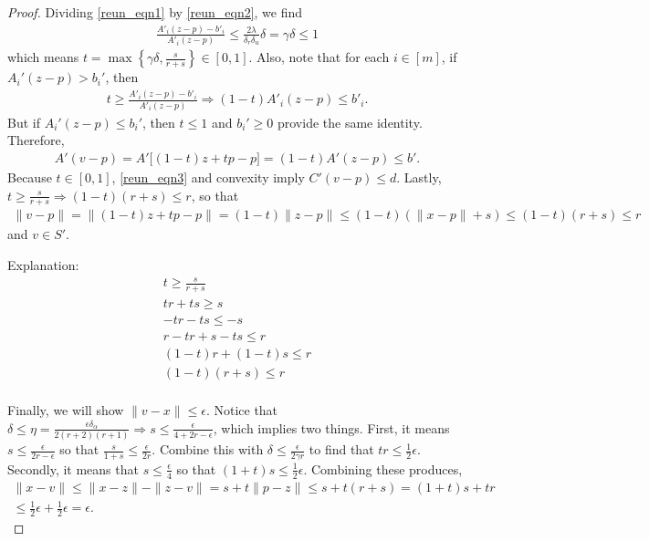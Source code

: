 \begin{proof}

Dividing \cref{reun_eqn1} by \cref{reun_eqn2}, we find
\begin{align*}
\frac{A'_i (z - p) - b'_i}{A'_i (z - p)} \le \frac{2\lambda}{\delta_r \delta_u}\delta = \gamma \delta \le 1
\end{align*}
which means $t = \max\left\{\gamma \delta, \frac{s}{r+s}\right\} \in [0, 1]$.
Also, note that for each $i \in [m]$, if $A_i'(z - p) > b_i'$, then
\begin{align*}
t \ge \frac{A'_i (z - p) - b'_i}{A'_i (z - p)}
\Longrightarrow (1-t) A'_i (z - p) \le b'_i.
\end{align*}
But if $A_i'(z - p) \le b_i'$, then $t \le 1$ and $b_i' \ge 0$ provide the same identity.
Therefore, 
\begin{align*}
A'(v - p) = A' \bigg[(1-t) z + tp - p\bigg] = (1-t) A' (z - p) \le b'.
\end{align*}
Because $t \in [0, 1]$, \cref{reun_eqn3} and convexity imply $C'(v - p) \le d$.
Lastly, $t \ge \frac{s}{r + s} \Longrightarrow (1 - t) \left(r + s\right) \le r$, so that
\begin{align*}
\|v - p\| = \|(1-t)z + t p - p\| = (1 - t) \|z - p\| \le (1 - t) \left(\|x - p\| + s\right) \le (1 - t) \left(r + s\right) \le r
\end{align*}
and $v \in S'$.
\begin{boxedcomment}
Explanation:
\begin{align*}
t \ge \frac{s}{r + s} \\
 tr + ts \ge s \\
- tr - ts \le -s \\
r - tr + s - ts \le r \\
(1 - t) r + (1 - t)s \le r \\
(1 - t) \left(r + s\right) \le r \\
\end{align*}
\end{boxedcomment}

Finally, we will show $\|v - x\| \le \epsilon$.
Notice that $\delta \le \eta = \frac{\epsilon\delta_{\alpha}}{2(r+2)(r + 1)} \Longrightarrow s \le \frac{\epsilon}{4 + 2r - \epsilon}$, which implies two things.
First, it means $s \le \frac{\epsilon}{2r - \epsilon}$ so that
$\frac {s}{1 + s} \le \frac {\epsilon} {2r}. $
Combine this with $\delta \le \frac {\epsilon} {2\gamma r}$ to find that $tr \le \frac 1 2 \epsilon$.
Secondly, it means that
$s \le \frac{\epsilon}{4}$ so that $(1 + t)s \le \frac 1 2 \epsilon$.
Combining these produces,
\begin{align*}
\|x - v\| 
\le \|x - z\| - \|z - v\| 
= s + t \|p - z\| 
\le s + t \left(r + s\right) 
= (1 + t)s + tr \\
\le \frac 1 2 \epsilon + \frac 1 2 \epsilon = \epsilon.
\end{align*}


\end{proof}
